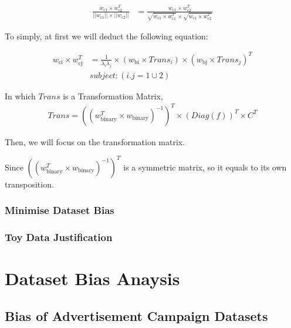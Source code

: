 \documentclass{sig-alternate}
\begin{document}
\begin{equation} \label{30} 
\begin{split}
\frac{w_{\text{c1}} \times w_{\text{c2}}^T} {||w_{\text{c1}}|| \times ||w_{\text{c2}}|| } & =  \frac{w_{\text{c1}} \times w_{\text{c2}}^T} {\sqrt{w_{\text{c1}} \times w_{\text{c1}}^T} \times \sqrt{w_{\text{c1}} \times w_{\text{c2}}^T} }
\end{split}
\end{equation}

To simply, at first we will deduct the following equation:

\begin{equation} \label{31} 
\begin{split}
w_{\text{ci}} \times w_{\text{cj}}^T & = \frac{1}{{\lambda}_{i}{\lambda}_{j} } \times (w_{\text{bi}} \times Trans_{i}) \times (w_{\text{bj}} \times Trans_{j})^T \\
& subject : (i.j = 1 \cup 2)
\end{split}
\end{equation}


In which \(Trans\) is a Transformation Matrix, 
\begin{equation} \label{31} 
\begin{split}
Trans = ((w_{\text{binary}}^T \times w_{\text{binary}})^{-1})^T \times (Diag(f))^T \times C^T  
\end{split}
\end{equation}

Then, we will focus on the transformation matrix. 

Since \(((w_{\text{binary}}^T \times w_{\text{binary}})^{-1})^T\) is a symmetric matrix, so it equals to its own transposition. 
\subsubsection{Minimise Dataset Bias}



\subsubsection{Toy Data Justification}

\section{Dataset Bias Anaysis}
\subsection{Bias of Advertisement Campaign Datasets}
\end{document}
